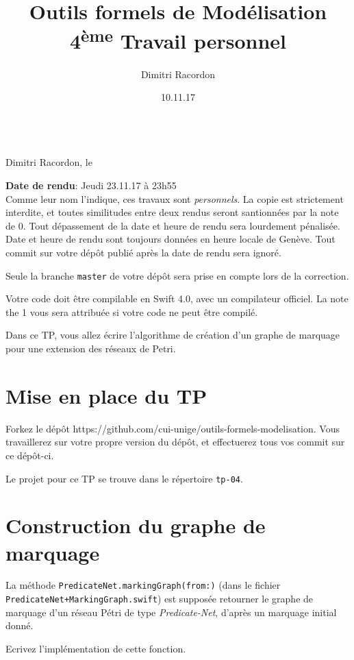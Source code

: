 \documentclass[a4paper, titlepage]{article}
\makeatletter
\numberwithin{figure}{section}
\numberwithin{table}{section}
\newcommand\deadline[1]{\def\@deadline{#1}}
\newcommand\objective[1]{\def\@objective{#1}}
\newcommand{\makecustomtitle}{%
	\begin{center}
		\huge\@title \\
		[1ex]\small Dimitri Racordon, le \@date
	\end{center}
	\begin{framed}\@deadline\end{framed}
	\begin{framed}\@objective\end{framed}
}
\makeatother
\begin{document}
\title{Outils formels de Modélisation \\ 4\textsuperscript{ème} Travail personnel}
\author{Dimitri Racordon}
\date{10.11.17}

\deadline{
\textbf{Date de rendu}: Jeudi 23.11.17 à 23h55 \\

  Comme leur nom l'indique, ces travaux sont \emph{personnels}.
  La copie est strictement interdite, et toutes similitudes entre deux rendus
  seront santionnées par la note de 0.
  Tout dépassement de la date et heure de rendu sera lourdement pénalisée.
  Date et heure de rendu sont toujours données en heure locale de Genève.
  Tout commit sur votre dépôt publié après la date de rendu sera ignoré.

  Seule la branche \texttt{master} de votre dépôt sera prise en compte
  lors de la correction.

  Votre code doit être compilable en Swift 4.0, avec un compilateur officiel.
  La note the 1 vous sera attribuée si votre code ne peut être compilé.
}

\objective{
  Dans ce TP, vous allez écrire l'algorithme de création d'un graphe de marquage
  pour une extension des réseaux de Petri.
}

\makecustomtitle

\section{Mise en place du TP}

Forkez le dépôt https://github.com/cui-unige/outils-formels-modelisation.
Vous travaillerez sur votre propre version du dépôt,
et effectuerez tous vos commit sur ce dépôt-ci.

Le projet pour ce TP se trouve dans le répertoire \texttt{tp-04}.

\section{Construction du graphe de marquage}

La méthode \texttt{PredicateNet.markingGraph(from:)}
(dans le fichier\\\texttt{PredicateNet+MarkingGraph.swift})
est supposée retourner le graphe de marquage d'un réseau Pétri de type \emph{Predicate-Net},
d'après un marquage initial donné.

Ecrivez l'implémentation de cette fonction.
\end{document}
